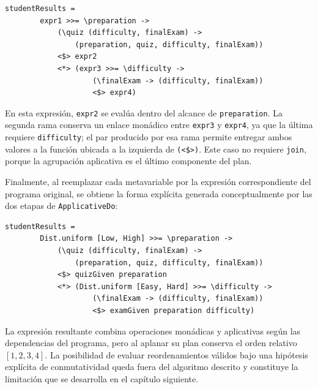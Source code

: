 \newpage
\begin{lstlisting}[style=haskell,caption={Resultado del desazucarado expresado mediante \texttt{expr1}--\texttt{expr4}.},label={lst:applicative-do-main-example-desugared-abstract}]
    studentResults =
        expr1 >>= \preparation ->
            (\quiz (difficulty, finalExam) ->
                (preparation, quiz, difficulty, finalExam))
            <$> expr2
            <*> (expr3 >>= \difficulty ->
                    (\finalExam -> (difficulty, finalExam))
                    <$> expr4)
\end{lstlisting}

En esta expresión, \texttt{expr2} se evalúa dentro del alcance de \texttt{preparation}. La segunda rama conserva un enlace monádico entre \texttt{expr3} y \texttt{expr4}, ya que la última requiere \texttt{difficulty}; el par producido por esa rama permite entregar ambos valores a la función ubicada a la izquierda de \verb|(<$>)|. Este caso no requiere \texttt{join}, porque la agrupación aplicativa es el último componente del plan.

Finalmente, al reemplazar cada metavariable por la expresión correspondiente del programa original, se obtiene la forma explícita generada conceptualmente por las dos etapas de \texttt{ApplicativeDo}:

\begin{lstlisting}[style=haskell,caption={Desazucarado aplicativo del modelo probabilístico del estudiante.},label={lst:applicative-do-main-example-desugared}]
    studentResults =
        Dist.uniform [Low, High] >>= \preparation ->
            (\quiz (difficulty, finalExam) ->
                (preparation, quiz, difficulty, finalExam))
            <$> quizGiven preparation
            <*> (Dist.uniform [Easy, Hard] >>= \difficulty ->
                    (\finalExam -> (difficulty, finalExam))
                    <$> examGiven preparation difficulty)
\end{lstlisting}

La expresión resultante combina operaciones monádicas y aplicativas según las dependencias del programa, pero al aplanar su plan conserva el orden relativo $[1,2,3,4]$. La posibilidad de evaluar reordenamientos válidos bajo una hipótesis explícita de conmutatividad queda fuera del algoritmo descrito y constituye la limitación que se desarrolla en el capítulo siguiente.
